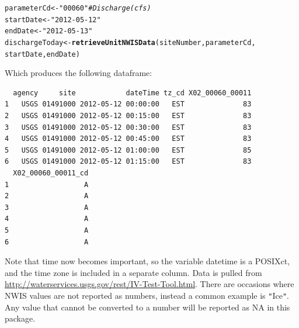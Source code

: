 \documentclass[a4paper,11pt]{article}\usepackage[]{graphicx}\usepackage[]{color}
\makeatletter
\newcommand{\hlstr}[1]{\textcolor[rgb]{0.192,0.494,0.8}{#1}}%
\newcommand{\hlcom}[1]{\textcolor[rgb]{0.678,0.584,0.686}{\textit{#1}}}%
\newcommand{\hlstd}[1]{\textcolor[rgb]{0.345,0.345,0.345}{#1}}%
\newcommand{\hlkwb}[1]{\textcolor[rgb]{0.69,0.353,0.396}{#1}}%
\newcommand{\hlkwd}[1]{\textcolor[rgb]{0.737,0.353,0.396}{\textbf{#1}}}%
\newenvironment{kframe}{%
 \def\at@end@of@kframe{}%
 \ifinner\ifhmode%
  \def\at@end@of@kframe{\end{minipage}}%
  \begin{minipage}{\columnwidth}%
 \fi\fi%
 \def\FrameCommand##1{\hskip\@totalleftmargin \hskip-\fboxsep
 \colorbox{shadecolor}{##1}\hskip-\fboxsep
     \hskip-\linewidth \hskip-\@totalleftmargin \hskip\columnwidth}%
 \MakeFramed {\advance\hsize-\width
   \@totalleftmargin\z@ \linewidth\hsize
   \@setminipage}}%
 {\par\unskip\endMakeFramed%
 \at@end@of@kframe}
\newenvironment{knitrout}{}{} %
\makeatother
\begin{document}
\begin{knitrout}
\color{fgcolor}\begin{kframe}
\begin{alltt}
\hlstd{parameterCd} \hlkwb{<-} \hlstr{"00060"}  \hlcom{# Discharge (cfs)}
\hlstd{startDate} \hlkwb{<-} \hlstr{"2012-05-12"}
\hlstd{endDate} \hlkwb{<-} \hlstr{"2012-05-13"}
\hlstd{dischargeToday} \hlkwb{<-} \hlkwd{retrieveUnitNWISData}\hlstd{(siteNumber, parameterCd,}
        \hlstd{startDate, endDate)}
\end{alltt}
\end{kframe}
\end{knitrout}

Which produces the following dataframe:
\begin{knitrout}
\color{fgcolor}\begin{kframe}
\begin{verbatim}
  agency     site            dateTime tz_cd X02_00060_00011
1   USGS 01491000 2012-05-12 00:00:00   EST              83
2   USGS 01491000 2012-05-12 00:15:00   EST              83
3   USGS 01491000 2012-05-12 00:30:00   EST              83
4   USGS 01491000 2012-05-12 00:45:00   EST              83
5   USGS 01491000 2012-05-12 01:00:00   EST              85
6   USGS 01491000 2012-05-12 01:15:00   EST              83
  X02_00060_00011_cd
1                  A
2                  A
3                  A
4                  A
5                  A
6                  A
\end{verbatim}
\end{kframe}
\end{knitrout}


Note that time now becomes important, so the variable datetime is a POSIXct, and the time zone is included in a separate column. Data is pulled from \url{http://waterservices.usgs.gov/rest/IV-Test-Tool.html}. There are occasions where NWIS values are not reported as numbers, instead a common example is \texttt{"}Ice\texttt{"}.  Any value that cannot be converted to a number will be reported as NA in this package.

\newpage


\FloatBarrier

\end{document}
